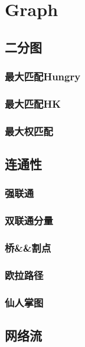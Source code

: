\section{Graph}
\large

\subsection{二分图}
\subsubsection{最大匹配Hungry}

\subsubsection{最大匹配HK}

\subsubsection{最大权匹配}


\subsection{连通性}
\subsubsection{强联通}

\subsubsection{双联通分量}

\subsubsection{桥\&\&割点}

\subsubsection{欧拉路径}

\subsubsection{仙人掌图}


\subsection{网络流}
